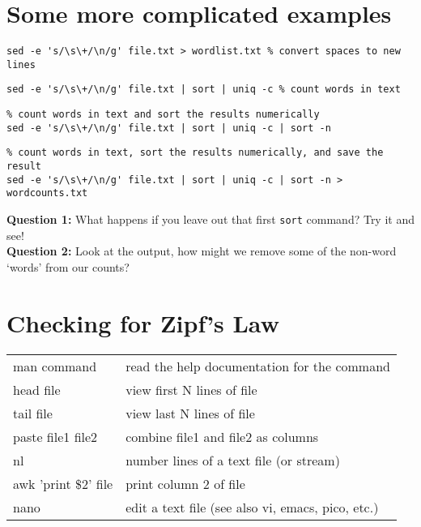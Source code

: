 \documentclass[12pt]{article}
\begin{document}
\section{Some more complicated examples}

\begin{verbatim}
sed -e 's/\s\+/\n/g' file.txt > wordlist.txt % convert spaces to new lines
\end{verbatim}

\begin{verbatim}
sed -e 's/\s\+/\n/g' file.txt | sort | uniq -c % count words in text
\end{verbatim}

\begin{verbatim}
% count words in text and sort the results numerically
sed -e 's/\s\+/\n/g' file.txt | sort | uniq -c | sort -n 
\end{verbatim}

\begin{verbatim}
% count words in text, sort the results numerically, and save the result
sed -e 's/\s\+/\n/g' file.txt | sort | uniq -c | sort -n > wordcounts.txt
\end{verbatim}

\noindent
\textbf{Question 1:} What happens if you leave out that first \texttt{sort} command?  Try it and see!\\

\noindent
\textbf{Question 2:} Look at the output, how might we remove some of the non-word `words' from our counts?\\

\section{Checking for Zipf's Law}

\begin{tabular}{ll}
man command & read the help documentation for the command \\
head file &	view first N lines of file\\
tail file &	view last N lines of file\\
paste file1 file2 & combine file1 and file2 as columns \\
nl & number lines of a text file (or stream)\\
awk '{print \$2}' file & print column 2 of file\\
nano & edit a text file (see also vi, emacs, pico, etc.)\\
\end{tabular}
\end{document}

